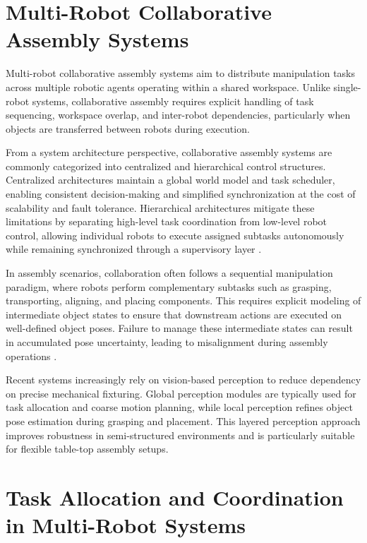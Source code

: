 \section{Multi-Robot Collaborative Assembly Systems}

Multi-robot collaborative assembly systems aim to distribute manipulation tasks across multiple robotic agents operating within a shared workspace. Unlike single-robot systems, collaborative assembly requires explicit handling of task sequencing, workspace overlap, and inter-robot dependencies, particularly when objects are transferred between robots during execution.

From a system architecture perspective, collaborative assembly systems are commonly categorized into centralized and hierarchical control structures. Centralized architectures maintain a global world model and task scheduler, enabling consistent decision-making and simplified synchronization at the cost of scalability and fault tolerance. Hierarchical architectures mitigate these limitations by separating high-level task coordination from low-level robot control, allowing individual robots to execute assigned subtasks autonomously while remaining synchronized through a supervisory layer \cite{gerkey2004formal}.

In assembly scenarios, collaboration often follows a sequential manipulation paradigm, where robots perform complementary subtasks such as grasping, transporting, aligning, and placing components. This requires explicit modeling of intermediate object states to ensure that downstream actions are executed on well-defined object poses. Failure to manage these intermediate states can result in accumulated pose uncertainty, leading to misalignment during assembly operations \cite{siciliano2016handbook}.

Recent systems increasingly rely on vision-based perception to reduce dependency on precise mechanical fixturing. Global perception modules are typically used for task allocation and coarse motion planning, while local perception refines object pose estimation during grasping and placement. This layered perception approach improves robustness in semi-structured environments and is particularly suitable for flexible table-top assembly setups.

\section{Task Allocation and Coordination in Multi-Robot Systems}

